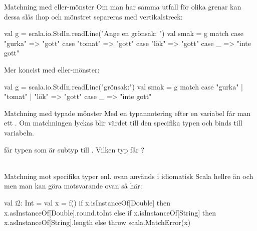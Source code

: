 \begin{Slide}{Matchning med eller-mönster}\SlideFontSmall
Om man har samma utfall för olika grenar kan dessa slås ihop och mönstret separeras med vertikalstreck: \code{|}
\begin{Code}
val g = scala.io.StdIn.readLine("Ange en grönsak: ")
val smak = g match 
  case "gurka" => "gott"
  case "tomat" => "gott"
  case "lök"   => "gott"
  case _ => "inte gott"
\end{Code}

Mer koncist med eller-mönster:

\begin{Code}
val g = scala.io.StdIn.readLine("grönsak:")
val smak = g match 
  case "gurka" | "tomat" | "lök" => "gott"
  case _ => "inte gott"
\end{Code}



\end{Slide}





\begin{Slide}{Matchning med typade mönster}\SlideFontSmall
Med en typannotering efter en variabel får man ett  . Om matchningen lyckas blir värdet  till den specifika typen och binds till variabeln.
 får typen  som är subtyp till . Vilken typ får ? \pause ~~
{\SlideFontTiny \\\vspace{0.5em} Matchning mot specifika typer enl. ovan används i idiomatisk Scala hellre än  och  men man kan göra motsvarande ovan så här:
\begin{Code}
val i2: Int =  
  val x = f()
  if x.isInstanceOf[Double] then x.asInstanceOf[Double].round.toInt
  else if x.isInstanceOf[String] then x.asInstanceOf[String].length
  else throw scala.MatchError(x)
\end{Code}
}
\end{Slide}

